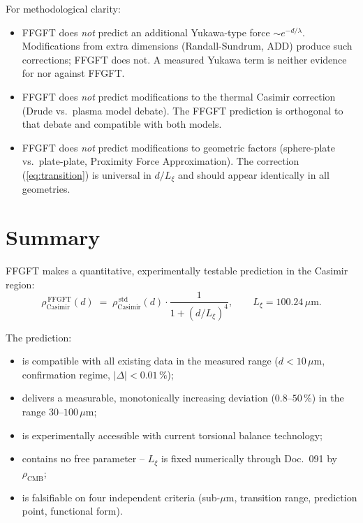 For methodological clarity:

\begin{itemize}[leftmargin=2em,itemsep=2pt,topsep=2pt]
  \item FFGFT does \emph{not} predict an additional Yukawa-type force
        $\sim e^{-d/\lambda}$. Modifications from extra dimensions
        (Randall-Sundrum, ADD) produce such corrections; FFGFT does
        not. A measured Yukawa term is neither evidence for nor
        against FFGFT.
  \item FFGFT does \emph{not} predict modifications to the thermal
        Casimir correction (Drude vs.\ plasma model debate). The
        FFGFT prediction is orthogonal to that debate and compatible
        with both models.
  \item FFGFT does \emph{not} predict modifications to geometric
        factors (sphere-plate vs.\ plate-plate, Proximity Force
        Approximation). The correction (\ref{eq:transition}) is
        universal in $d/L_\xi$ and should appear identically in
        all geometries.
\end{itemize}

\section{Summary}

FFGFT makes a quantitative, experimentally testable prediction in
the Casimir region:
\begin{equation*}
  \boxed{
    \rho_\text{Casimir}^{\,\text{FFGFT}}(d)
    \;=\; \rho_\text{Casimir}^{\,\text{std}}(d)
          \cdot \frac{1}{1 + (d/L_\xi)^4},
    \qquad L_\xi = 100.24\,\mu\text{m}.
  }
\end{equation*}

The prediction:
\begin{itemize}[leftmargin=2em,itemsep=2pt,topsep=2pt]
  \item is compatible with all existing data in the measured range
        ($d < 10\,\mu$m, confirmation regime, $|\Delta| < 0.01\,\%$);
  \item delivers a measurable, monotonically increasing deviation
        ($0.8$--$50\,\%$) in the range $30$--$100\,\mu$m;
  \item is experimentally accessible with current torsional balance
        technology;
  \item contains no free parameter -- $L_\xi$ is fixed numerically
        through Doc.~091 by $\rho_\text{CMB}$;
  \item is falsifiable on four independent criteria
        (sub-$\mu$m, transition range, prediction point, functional
        form).
\end{itemize}

